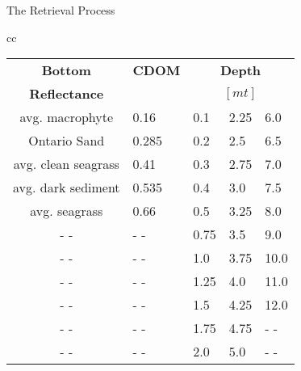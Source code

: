 \documentclass[mathserif]{beamer}
\begin{document}
\begin{frame}{}
\begin{columns}[t]
\begin{column}{.3\linewidth}
\begin{block}{The Retrieval Process}
\begin{center}
\begin{table}
\begin{tabular}{cc}
\begin{tabular}{c|l|l|l|l}
        		\bfseries{Bottom} & \bfseries{CDOM}   & \multicolumn{3}{c}{ \bfseries{Depth} }	\\ 
		\bfseries{Reflectance}	&		 	&  \multicolumn{3}{c}{ $[mt]$  }	 \\ \hline \hline
			avg. macrophyte		& 0.16 	& 	0.1	& 2.25	& 6.0	\\
			Ontario Sand			& 0.285	&	0.2	& 2.5	& 6.5	\\
			avg. clean seagrass		& 0.41	&	0.3	& 2.75	& 7.0	\\
			avg. dark sediment		& 0.535	&	0.4	& 3.0	& 7.5	\\
			avg. seagrass			& 0.66	&	0.5	& 3.25	& 8.0	\\
					- -			& - -		&	0.75	& 3.5	& 9.0	\\
					- -			& - -		&	1.0	& 3.75	& 10.0	\\
					- -			& - -		&	1.25	& 4.0	& 11.0	\\
					- -			& - -		&	1.5	& 4.25	& 12.0	\\
					- -			& - -		&	1.75 & 4.75	& - -	\\  
					- -			& - -		&	2.0   & 5.0	& - -	\\   
      		\end{tabular}\\ 
      \end{tabular}
\end{table}
\end{center}
\vspace{0.8cm}

\end{block}



\end{column}
\end{columns}
\end{frame}
\end{document}
